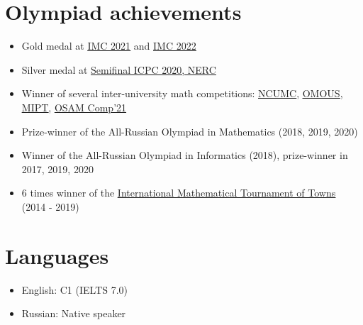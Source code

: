 \documentclass[letterpaper,11pt]{article}
\newcommand{\resumeItemListStart}{\begin{itemize}}
\newcommand{\resumeItemListEnd}{\end{itemize}\vspace{-8pt}}
\newcommand{\resumeItem}[1]{\item\small{{#1 \vspace{-2pt}}}}
\newcommand{\resumeSubItem}[1]{\resumeItem{#1}\vspace{-4pt}}
\begin{document}
\section{Olympiad achievements}
    \resumeItemListStart
        \resumeSubItem{Gold medal at \href{https://imc-math.org.uk/?year=2021}{\underline{IMC 2021}} and \href{https://imc-math.org.uk/?year=2022}{\underline{IMC 2022}}}
        \resumeSubItem{Silver medal at \href{https://neerc.ifmo.ru/archive/2020.html}{\underline{Semifinal ICPC 2020, NERC}}}
        \resumeSubItem{Winner of several inter-university math competitions: \href{https://iuhd.edu.tm/competition/44}{\underline{NCUMC}}, \href{https://iuhd.edu.tm/competition/45}{\underline{OMOUS}}, \href{http://www.rkarasev.ru/note/66}{\underline{MIPT}}, \href{https://cs.hse.ru/en/announcements/504365867.html}{\underline{OSAM Comp'21}}}
        \resumeSubItem{Prize-winner of the All-Russian Olympiad in Mathematics (2018, 2019, 2020)}
        \resumeSubItem{Winner of the All-Russian Olympiad in Informatics (2018), prize-winner in 2017, 2019, 2020}
        \resumeSubItem{6 times winner of the \href{https://www.turgor.ru/en/}{\underline{International Mathematical Tournament of Towns}} (2014 - 2019)}
    \resumeItemListEnd


\section{Languages}
    \resumeItemListStart
        \resumeSubItem{English: C1 (IELTS 7.0)}
        \resumeSubItem{Russian: Native speaker}
    \resumeItemListEnd
\end{document}
